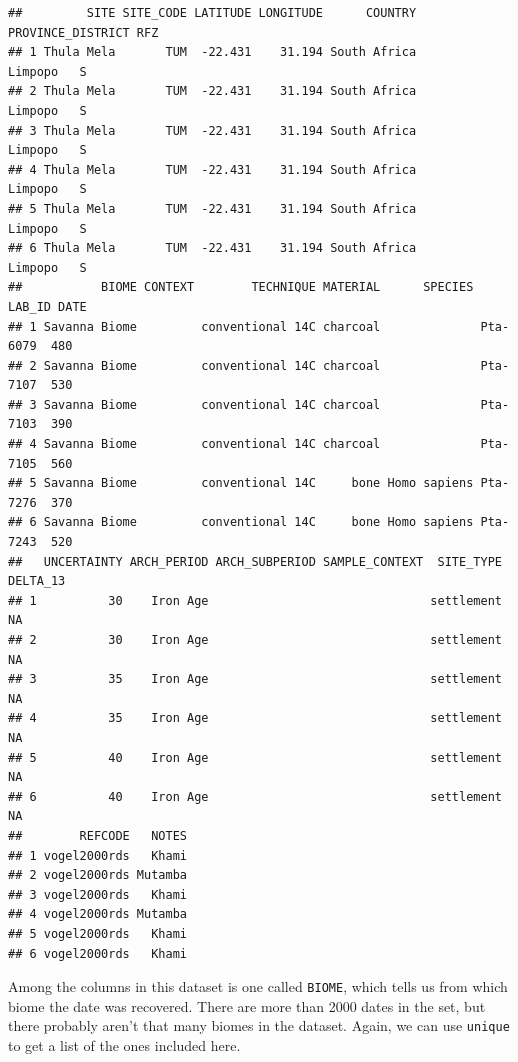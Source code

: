 \documentclass[
]{book}
\newenvironment{Shaded}{\begin{snugshade}}{\end{snugshade}}
\newcommand{\CommentTok}[1]{\textcolor[rgb]{0.56,0.35,0.01}{\textit{#1}}}
\newcommand{\FunctionTok}[1]{\textcolor[rgb]{0.00,0.00,0.00}{#1}}
\newcommand{\NormalTok}[1]{#1}
\newcommand{\SpecialCharTok}[1]{\textcolor[rgb]{0.00,0.00,0.00}{#1}}
\begin{document}
\begin{verbatim}
##         SITE SITE_CODE LATITUDE LONGITUDE      COUNTRY PROVINCE_DISTRICT RFZ
## 1 Thula Mela       TUM  -22.431    31.194 South Africa           Limpopo   S
## 2 Thula Mela       TUM  -22.431    31.194 South Africa           Limpopo   S
## 3 Thula Mela       TUM  -22.431    31.194 South Africa           Limpopo   S
## 4 Thula Mela       TUM  -22.431    31.194 South Africa           Limpopo   S
## 5 Thula Mela       TUM  -22.431    31.194 South Africa           Limpopo   S
## 6 Thula Mela       TUM  -22.431    31.194 South Africa           Limpopo   S
##           BIOME CONTEXT        TECHNIQUE MATERIAL      SPECIES   LAB_ID DATE
## 1 Savanna Biome         conventional 14C charcoal              Pta-6079  480
## 2 Savanna Biome         conventional 14C charcoal              Pta-7107  530
## 3 Savanna Biome         conventional 14C charcoal              Pta-7103  390
## 4 Savanna Biome         conventional 14C charcoal              Pta-7105  560
## 5 Savanna Biome         conventional 14C     bone Homo sapiens Pta-7276  370
## 6 Savanna Biome         conventional 14C     bone Homo sapiens Pta-7243  520
##   UNCERTAINTY ARCH_PERIOD ARCH_SUBPERIOD SAMPLE_CONTEXT  SITE_TYPE DELTA_13
## 1          30    Iron Age                               settlement       NA
## 2          30    Iron Age                               settlement       NA
## 3          35    Iron Age                               settlement       NA
## 4          35    Iron Age                               settlement       NA
## 5          40    Iron Age                               settlement       NA
## 6          40    Iron Age                               settlement       NA
##        REFCODE   NOTES
## 1 vogel2000rds   Khami
## 2 vogel2000rds Mutamba
## 3 vogel2000rds   Khami
## 4 vogel2000rds Mutamba
## 5 vogel2000rds   Khami
## 6 vogel2000rds   Khami
\end{verbatim}

Among the columns in this dataset is one called \texttt{BIOME}, which tells us from which biome the date was recovered. There are more than 2000 dates in the set, but there probably aren't that many biomes in the dataset. Again, we can use \texttt{unique} to get a list of the ones included here.

\begin{Shaded}
\end{Shaded}
\end{document}
